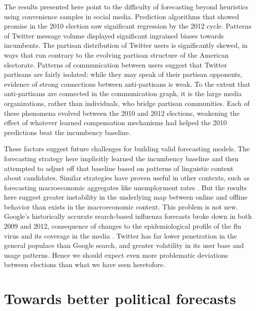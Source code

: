 \documentclass{article}
\begin{document}
The results presented here point to the difficulty of forecasting
beyond heuristics using 
convenience samples in social media. Prediction algorithms that showed
promise in the 2010 election saw significant regression by the 2012
cycle. Patterns of Twitter message volume displayed significant
ingrained biases towards incumbents. The partisan distribution of
Twitter users is significantly skewed, in ways that run contrary to
the evolving partisan structure of the American electorate. Patterns
of communication between users suggest that Twitter partisans are
fairly isolated: while they may speak of their partisan opponents,
evidence of strong connections between anti-partisans is weak. To the
extent that anti-partisans are connected in the communication graph,
it is the large media organizations, rather than individuals, who
bridge partisan communities. Each of these phenomena evolved between
the 2010 and 2012 elections, weakening the effect of whatever learned
compensation mechanisms had helped the 2010 predictions beat the
incumbency baseline.

These factors suggest future challenges for building valid forecasting
models. The forecasting strategy here implicitly learned the
incumbency baseline and then attempted to adjust off that baseline
based on patterns of linguistic content about candidates. Similar
strategies have proven useful in other contexts, such as forecasting
macroeconomic aggregates like unemployment rates
\cite{choi2012predicting}. But the results here suggest greater
instability in the underlying map between online and offline behavior
than exists in the macroeconomic context. This problem is not
new. Google's historically accurate search-based influenza forecasts
\cite{ginsberg2008detecting} broke down in both 2009 and 2012,
consequence of changes to the epidemiological profile of the flu virus
and its coverage in the media \cite{butler2013google}. Twitter has
far lower penetration in the general populace than Google search, and
greater volatility in its user base and usage patterns. Hence we
should expect even more problematic deviations between elections than
what we have seen heretofore. 



\section{Towards better political forecasts}
\label{sec:towards-bett-polit}
\end{document}
